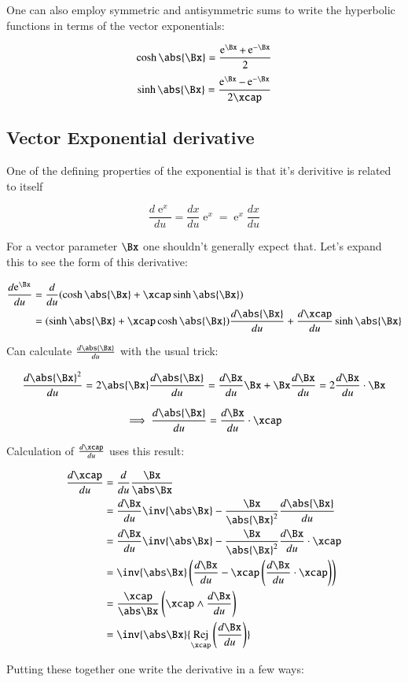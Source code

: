 \documentclass{article}      %
\DeclareMathOperator{\Exp}{e}
\DeclareMathOperator{\Rej}{Rej}
\newcommand{\ddu}[1] {\frac {d{#1}} {du}}
\begin{document}
One can also employ symmetric and antisymmetric sums to write the hyperbolic functions in terms of the
vector exponentials:

\[
\cosh\abs{\Bx} = \frac{\Exp^\Bx + \Exp^{-\Bx}}{2}
\]
\[
\sinh\abs{\Bx} = \frac{\Exp^\Bx - \Exp^{-\Bx}}{2\xcap}
\]

\subsection{ Vector Exponential derivative }
One of the defining properties of the exponential is that it's derivitive is related to itself

\[
\ddu{\Exp^{x}} = \ddu{x}\Exp^{x} = \Exp^{x} \ddu{x}
\]

For a vector parameter $\Bx$ one shouldn't generally expect that.  Let's expand this to see the form of this
derivative:

\begin{align*}
\ddu{\Exp^{\Bx}} 
&= \ddu{}( \cosh\abs{\Bx} + \xcap \sinh\abs{\Bx} ) \\
&= ( \sinh\abs{\Bx} + \xcap \cosh\abs{\Bx} ) \ddu{\abs{\Bx}} + \ddu{\xcap} \sinh\abs{\Bx} \\
\end{align*}

Can calculate $\ddu{\abs{\Bx}}$ with the usual trick:

\[
\ddu{\abs{\Bx}^2} = 2\abs{\Bx}\ddu{\abs{\Bx}} = \ddu{\Bx}\Bx + \Bx\ddu{\Bx} = 2 \ddu{\Bx} \cdot \Bx
\]

\[
\implies
\ddu{\abs{\Bx}} = \ddu{\Bx} \cdot \xcap
\]

Calculation of $\ddu{\xcap}$ uses this result:

\begin{align*}
\ddu{\xcap}
&= \ddu{}\frac{\Bx}{\abs\Bx}  \\
&= \ddu{\Bx}\inv{\abs\Bx} - \frac{\Bx}{\abs{\Bx}^2}\ddu{\abs{\Bx}} \\
&= \ddu{\Bx}\inv{\abs\Bx} - \frac{\Bx}{\abs{\Bx}^2} \ddu{\Bx} \cdot \xcap \\
&= \inv{\abs\Bx}\left( \ddu{\Bx} - \xcap \left(\ddu{\Bx} \cdot \xcap\right) \right) \\
&= \frac{\xcap}{\abs\Bx} \left(\xcap \wedge \ddu{\Bx} \right) \\
&= \inv{\abs\Bx} {\Rej_{\xcap}\left(\ddu{\Bx}\right)} \\
\end{align*}

Putting these together one write the derivative in a few ways:
\end{document}

